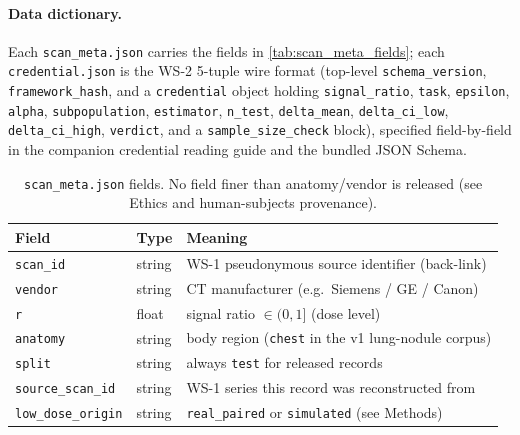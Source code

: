 \documentclass{article}
\begin{document}
\paragraph{Data dictionary.} Each \texttt{scan\_meta.json} carries the
fields in \autoref{tab:scan_meta_fields}; each \texttt{credential.json} is
the WS-2 5-tuple wire format (top-level \texttt{schema\_version},
\texttt{framework\_hash}, and a \texttt{credential} object holding
\texttt{signal\_ratio}, \texttt{task}, \texttt{epsilon}, \texttt{alpha},
\texttt{subpopulation}, \texttt{estimator}, \texttt{n\_test},
\texttt{delta\_mean}, \texttt{delta\_ci\_low}, \texttt{delta\_ci\_high},
\texttt{verdict}, and a \texttt{sample\_size\_check} block), specified
field-by-field in the companion credential reading guide and the bundled
JSON Schema.

\begin{table}[h]
    \centering
    \small
    \begin{tabular}{lll}
        \toprule
        \textbf{Field} & \textbf{Type} & \textbf{Meaning} \\
        \midrule
        \texttt{scan\_id}        & string & WS-1 pseudonymous source identifier (back-link) \\
        \texttt{vendor}          & string & CT manufacturer (e.g.\ Siemens / GE / Canon) \\
        \texttt{r}               & float  & signal ratio $\in (0, 1]$ (dose level) \\
        \texttt{anatomy}         & string & body region (\texttt{chest} in the v1 lung-nodule corpus) \\
        \texttt{split}           & string & always \texttt{test} for released records \\
        \texttt{source\_scan\_id}& string & WS-1 series this record was reconstructed from \\
        \texttt{low\_dose\_origin}& string & \texttt{real\_paired} or \texttt{simulated} (see Methods) \\
        \bottomrule
    \end{tabular}
    \caption{\texttt{scan\_meta.json} fields. No field finer than
    anatomy/vendor is released (see Ethics and human-subjects provenance).}
    \label{tab:scan_meta_fields}
\end{table}
\end{document}
